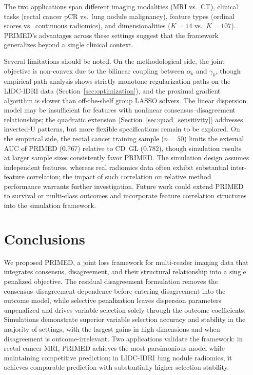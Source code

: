 \documentclass[referee,lineno,pdflatex,sn-vancouver-num]{sn-jnl}
\begin{document}
The two applications span different imaging modalities (MRI vs.\ CT), clinical tasks (rectal cancer pCR vs.\ lung nodule malignancy), feature types (ordinal scores vs.\ continuous radiomics), and dimensionalities ($K = 14$ vs.\ $K = 107$).
PRIMED's advantages across these settings suggest that the framework generalizes beyond a single clinical context.

Several limitations should be noted.
On the methodological side, the joint objective is non-convex due to the bilinear coupling between $\alpha_k$ and $\gamma_k$, though empirical path analysis shows strictly monotone regularization paths on the LIDC-IDRI data (Section~\ref{sec:optimization}), and the proximal gradient algorithm is slower than off-the-shelf group LASSO solvers.
The linear dispersion model may be insufficient for features with nonlinear consensus--disagreement relationships; the quadratic extension (Section~\ref{sec:quad_sensitivity}) addresses inverted-U patterns, but more flexible specifications remain to be explored.
On the empirical side, the rectal cancer training sample ($n = 50$) limits the external AUC of PRIMED ($0.767$) relative to CD~GL ($0.782$), though simulation results at larger sample sizes consistently favor PRIMED.
The simulation design assumes independent features, whereas real radiomics data often exhibit substantial inter-feature correlation; the impact of such correlation on relative method performance warrants further investigation.
Future work could extend PRIMED to survival or multi-class outcomes and incorporate feature correlation structures into the simulation framework.

\section{Conclusions}\label{sec:conclusions}

We proposed PRIMED, a joint loss framework for multi-reader imaging data that integrates consensus, disagreement, and their structural relationship into a single penalized objective.
The residual disagreement formulation removes the consensus--disagreement dependence before entering disagreement into the outcome model, while selective penalization leaves dispersion parameters unpenalized and drives variable selection solely through the outcome coefficients.
Simulations demonstrate superior variable selection accuracy and stability in the majority of settings, with the largest gains in high dimensions and when disagreement is outcome-irrelevant.
Two applications validate the framework: in rectal cancer MRI, PRIMED achieves the most parsimonious model while maintaining competitive prediction; in LIDC-IDRI lung nodule radiomics, it achieves comparable prediction with substantially higher selection stability.
\end{document}
